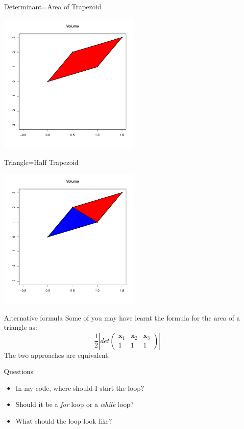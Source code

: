 \documentclass[10pt]{beamer}
\begin{document}
\begin{frame}{Determinant=Area of Trapezoid}
  \begin{center}
    \includegraphics[height=7cm]{RCode/geom3.pdf}
  \end{center}
\end{frame}
\begin{frame}{Triangle=Half Trapezoid}
  \begin{center}
    \includegraphics[height=7cm]{RCode/geom4.pdf}
  \end{center}
\end{frame}
\begin{frame}{Alternative formula}
  Some of you may have learnt the formula for the area of a triangle as:
  \begin{equation}
    \frac{1}{2}\left|det\left(
        \begin{array}{ccc}
          {\bm x_1}& {\bm x_2}& {\bm x_3}\\
          1 & 1 & 1
        \end{array}
      \right)\right|
  \end{equation}
  The two approaches are equivalent.
\end{frame}
\begin{frame}{Questions}
  \begin{itemize}
  \item In my code, where should I start the loop?\\

  \item Should it be a {\em for} loop or a {\em while} loop?

  \item What should the loop look like?
  \end{itemize}
\end{frame}
\end{document}
